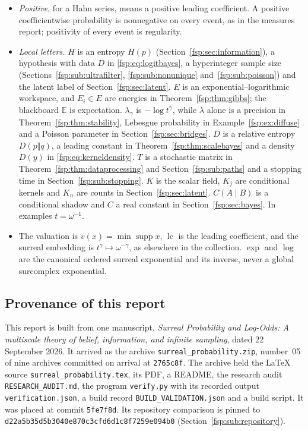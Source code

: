 \documentclass[11pt,a4paper]{article}
\numberwithin{equation}{section}
\theoremstyle{definition}
\theoremstyle{remark}
\newcommand{\E}{\mathbb E}
\newcommand{\lc}{\operatorname{lc}}
\newcommand{\supp}{\operatorname{supp}}
\newcommand{\pin}{\texttt{d22a5b35d5b3040e870c3cfd6d1c8f7259e094b0}}
\begin{document}
\begin{itemize}
Theorem~\ref{fsp:thm:faircoin} is the expectation of a power of an ordinary random
variable, which the measures report calls a fourth-power expectation; no moment
problem appears here.
\item \emph{Positive}, for a Hahn series, means a positive leading coefficient.
A positive coefficientwise probability is nonnegative on every event, as in the
measures report; positivity of every event is regularity.
\item \emph{Local letters.} $H$ is an entropy $H(p)$ (Section~\ref{fsp:sec:information}),
a hypothesis with data $D$ in \eqref{fsp:eq:logitbayes}, a hyperinteger sample size
(Sections~\ref{fsp:sub:ultrafilter}, \ref{fsp:sub:nonunique} and~\ref{fsp:sub:poisson}) and the latent label of Section~\ref{fsp:sec:latent}.
$E$ is an exponential--logarithmic workspace, and $E_i\in E$ are energies in
Theorem~\ref{fsp:thm:gibbs}; the blackboard $\E$ is expectation. $\lambda_\gamma$
is $-\log t^\gamma$, while $\lambda$ alone is a precision in
Theorem~\ref{fsp:thm:stability}, Lebesgue probability in
Example~\ref{fsp:ex:diffuse} and a Poisson parameter in
Section~\ref{fsp:sec:bridges}. $D$ is a relative entropy $D(p\Vert q)$, a leading
constant in Theorem~\ref{fsp:thm:scalebayes} and a density $D(y)$ in
\eqref{fsp:eq:kerneldensity}. $T$ is a stochastic matrix in
Theorem~\ref{fsp:thm:dataprocessing} and Section~\ref{fsp:sub:paths} and a stopping time in
Section~\ref{fsp:sub:stopping}. $K$ is the scalar field, $K_j$ are conditional kernels and $K_n$ are
counts in Section~\ref{fsp:sec:latent}. $C(A\mid B)$ is a conditional shadow and
$C$ a real constant in Section~\ref{fsp:sec:bayes}. In examples
$t=\omega^{-1}$.
\item The valuation is $v(x)=\min\supp x$, $\lc$ is the leading coefficient, and
the surreal embedding is $t^\gamma\mapsto\omega^{-\gamma}$, as elsewhere in the
collection. $\exp$ and $\log$ are the canonical ordered surreal exponential and
its inverse, never a global surcomplex exponential.
\end{itemize}

\subsection{Provenance of this report}\label{fsp:sec:provenance}
This report is built from one manuscript, \emph{Surreal Probability and
Log-Odds: A multiscale theory of belief, information, and infinite sampling},
dated 22 September 2026. It arrived as the archive
\nolinkurl{surreal_probability.zip}, number~05 of nine archives committed on
arrival at \texttt{2765c8f}. The archive held the LaTeX source
\texttt{surreal\_probability.tex}, its PDF, a README, the research audit
\texttt{RESEARCH\_AUDIT.md}, the program \texttt{verify.py} with its recorded
output \texttt{verification.json}, a build record \texttt{BUILD\_VALIDATION.json}
and a build script. It was placed at commit \texttt{5fe7f8d}. Its repository
comparison is pinned to \texttt{\pin} (Section~\ref{fsp:sub:repository}).
\end{document}
